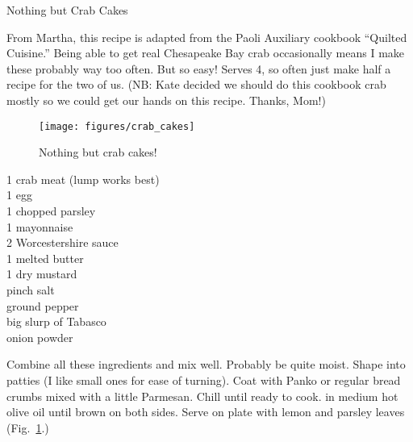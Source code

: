\begin{entry}{Nothing but Crab Cakes}

\begin{open}
  From Martha, this recipe is adapted from the Paoli Auxiliary cookbook
  ``Quilted Cuisine.'' Being able to get real Chesapeake Bay crab occasionally
  means I make these probably way too often. But so easy! Serves 4, so often
  just make half a recipe for the two of us. (NB: Kate decided we should do
  this cookbook crab mostly so we could get our hands on this recipe. Thanks,
  Mom!)
\end{open}
\begin{figure}
    \centering
    \texttt{[image: figures/crab\_cakes]}
    \caption{Nothing but crab cakes!}
    \label{fig:crab-cakes}
\end{figure}
\begin{ingredients}
    \SI{1}{\pound} crab meat (lump works best)\\
    1 egg\\
    \SI{1}{\tblspoon} chopped parsley\\
    \SI{1}{\tblspoon} mayonnaise\\
    \SI{2}{\teaspoon} Worcestershire sauce\\
    \SI{1}{\tblspoon} melted butter\\
    \SI{1}{\teaspoon} dry mustard \\
    pinch salt\\
    ground pepper\\
    big slurp of Tabasco\\
    onion powder
\end{ingredients}
Combine all these ingredients and mix well. Probably be quite moist. Shape
into patties (I like small ones for ease of turning). Coat with Panko or
regular bread crumbs mixed with a little Parmesan. Chill until ready to
cook. \Saute in medium hot olive oil until brown on both sides.  Serve on plate with lemon and parsley leaves (Fig.~\ref{fig:crab-cakes}.)
\end{entry}

